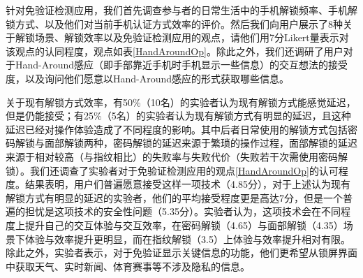 针对免验证检测应用，我们首先调查参与者的日常生活中的手机解锁频率、手机解锁方式、以及他们对当前手机认证方式效率的评价。然后我们向用户展示了8种关于解锁场景、解锁效率以及免验证检测应用的观点，请他们用7分Likert量表示对该观点的认同程度，观点如表\ref{HandAroundOp}。除此之外，我们还调研了用户对于Hand-Around感应（即手部靠近手机时手机显示一些信息）的交互想法的接受度，以及询问他们愿意以Hand-Around感应的形式获取哪些信息。

关于现有解锁方式效率，有50\%（10名）的实验者认为现有解锁方式能感觉延迟，但是仍能接受；有25\%（5名）的实验者认为现有解锁方式有明显的延迟，且这种延迟已经对操作体验造成了不同程度的影响。其中后者日常使用的解锁方式包括密码解锁与面部解锁两种，密码解锁的延迟来源于繁琐的操作过程，面部解锁的延迟来源于相对较高（与指纹相比）的失败率与失败代价（失败若干次需使用密码解锁）。我们还调查了实验者对于免验证检测应用的观点\ref{HandAroundOp}的认可程度。结果表明，用户们普遍愿意接受这样一项技术（4.85分），对于上述认为现有解锁方式有明显的延迟的实验者，他们的平均接受程度更是高达7分，但是一个普遍的担忧是这项技术的安全性问题（5.35分）。实验者认为，这项技术会在不同程度上提升自己的交互体验与交互效率，在密码解锁（4.65）与面部解锁（4.35）场景下体验与效率提升更明显，而在指纹解锁（3.5）上体验与效率提升相对有限。除此之外，实验者表示，对于免验证显示关键信息的功能，他们更希望从锁屏界面中获取天气、实时新闻、体育赛事等不涉及隐私的信息。